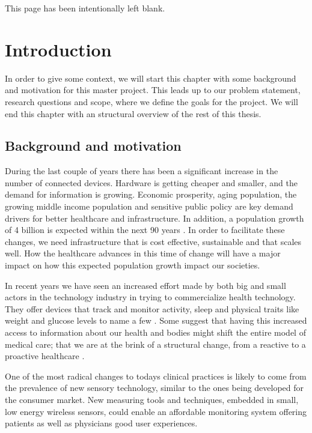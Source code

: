 \newpage
\thispagestyle{empty}
This page has been intentionally left blank.

\newpage

\section{Introduction} 

\label{sec:introduction}

In order to give some context, we will start this chapter with some background and motivation for this master project. This leads up to our problem statement, research questions and scope, where we define the goals for the project. We will end this chapter with an structural overview of the rest of this thesis.

\subsection{Background and motivation} 

\label{sub:background_and_motivation}

During the last couple of years there has been a significant increase in the number of connected devices. Hardware is getting cheaper and smaller, and the demand for information is growing. Economic prosperity, aging population, the growing middle income population and sensitive public policy are key demand drivers for better healthcare and infrastructure. In addition, a population growth of 4 billion is expected within the next 90 years \cite{WPP2015:Methodology}. In order to facilitate these changes, we need infrastructure that is cost effective, sustainable and that scales well. How the healthcare advances in this time of change will have a major impact on how this expected population growth impact our societies. 

In recent years we have seen an increased effort made by both big and small actors in the technology industry in trying to commercialize health technology. They offer devices that track and monitor activity, sleep and physical traits like weight and glucose levels to name a few \cite{fitbit, fitbit:scale:6}. Some suggest that having this increased access to information about our health and bodies might shift the entire model of medical care; that we are at the brink of a structural change, from a reactive to a proactive healthcare \cite{helsit:kari:8, johnmaeda:9, deloitte:healthcare3:0:10}.

One of the most radical changes to todays clinical practices is likely to come from the prevalence of new sensory technology, similar to the ones being developed for the consumer market. New measuring tools and techniques, embedded in small, low energy wireless sensors, could enable an affordable monitoring system offering patients as well as physicians good user experiences.

